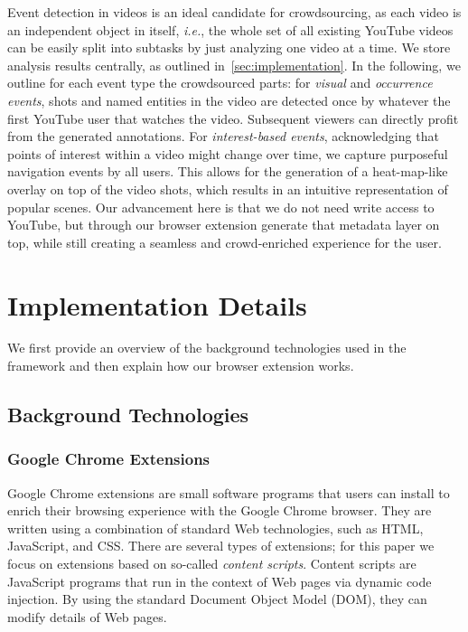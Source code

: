\documentclass[runningheads,a4paper]{llncs}
\begin{document}
Event detection in videos is an ideal candidate for crowdsourcing, as each video is an independent object in itself, \emph{i.e.}, the whole set of all existing YouTube videos can be easily split into subtasks by just analyzing one video at a time. We store analysis results centrally, as outlined in~\autoref{sec:implementation}. In the following, we outline for each event type the crowdsourced parts: for \emph{visual} and \emph{occurrence events}, shots and named entities in the video are detected once by whatever the first YouTube user that watches the video. Subsequent viewers can directly profit from the generated annotations. For \emph{interest-based events}, acknowledging that points of interest within a video might change over time, we capture purposeful navigation events by all users. This allows for the generation of a heat-map-like overlay on top of the video shots, which results in an intuitive representation of popular scenes. Our advancement here is that we do not need write access to YouTube, but through our browser extension generate that metadata layer on top, while still creating a seamless and crowd-enriched experience for the user. 

\section{Implementation Details} \label{sec:implementation}
We first provide an overview of the background technologies used in the framework and then explain how our browser extension works.

\subsection{Background Technologies}

\subsubsection{Google Chrome Extensions}
Google Chrome extensions are small software programs that users can install to enrich their browsing experience with the Google Chrome browser. They are written using a combination of standard Web technologies, such as HTML, JavaScript, and CSS. There are several types of extensions; for this paper we focus on extensions based on so-called \emph{content scripts}. Content scripts are JavaScript programs that run in the context of Web pages via dynamic code injection. By using the standard Document Object Model (DOM), they can modify details of Web pages.
\end{document}
